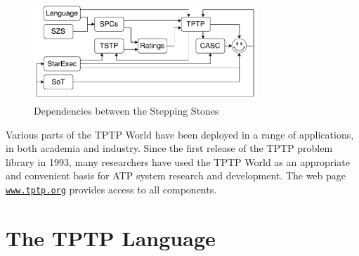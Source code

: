 \documentclass[runningheads]{llncs}
\begin{document}
\begin{figure}[htbp]
\centering
\includegraphics[width=0.75\textwidth]{Dependencies.pdf}
\caption{Dependencies between the Stepping Stones}
\label{Dependencies}
\end{figure}

Various parts of the TPTP World have been deployed in a range of applications, in both academia 
and industry.
Since the first release of the TPTP problem library in 1993, many researchers have used the 
TPTP World as an appropriate and convenient basis for ATP system research and development. 
The web page \href{http://www.tptp.org}{{\tt www.tptp.org}} provides access to all components.


\section{The TPTP Language}
\label{Languages}
\end{document}
